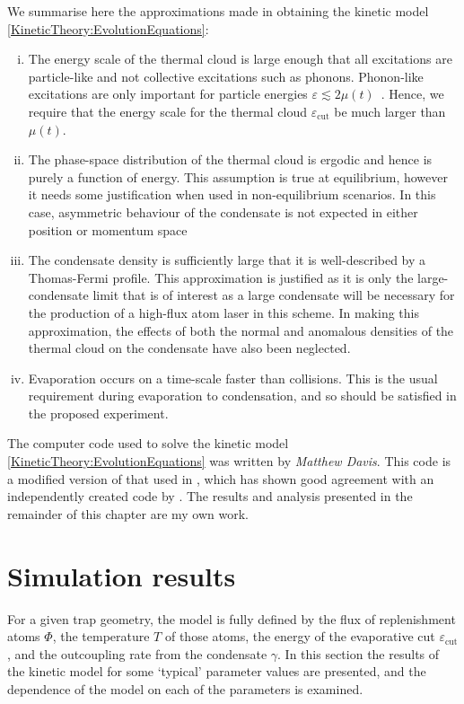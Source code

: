 We summarise here the approximations made in obtaining the kinetic model \eqref{KineticTheory:EvolutionEquations}:
\begin{enumerate}[(i)]
    \item The energy scale of the thermal cloud is large enough that all excitations are particle-like and not collective excitations such as phonons. Phonon-like excitations are only important for particle energies $\varepsilon \lesssim 2\mu(t)$~\citep[\S 8.3.1]{PethickSmith}. Hence, we require that the energy scale for the thermal cloud $\varepsilon_\text{cut}$ be much larger than $\mu(t)$.
    \item The phase-space distribution of the thermal cloud is ergodic and hence is purely a function of energy. This assumption is true at equilibrium, however it needs some justification when used in non-equilibrium scenarios. In this case, asymmetric behaviour of the condensate is not expected in either position or momentum space 
    \item The condensate density is sufficiently large that it is well-described by a Thomas-Fermi profile. This approximation is justified as it is only the large-condensate limit that is of interest as a large condensate will be necessary for the production of a high-flux atom laser in this scheme. In making this approximation, the effects of both the normal and anomalous densities of the thermal cloud on the condensate have also been neglected.
    \item Evaporation occurs on a time-scale faster than collisions. This is the usual requirement during evaporation to condensation, and so should be satisfied in the proposed experiment.
\end{enumerate}

The computer code used to solve the kinetic model \eqref{KineticTheory:EvolutionEquations} was written by \emph{Matthew Davis}.  This code is a modified version of that used in \citep{Davis:2000vn}, which has shown good agreement with an independently created code by \citet{Bijlsma:2000}.  The results and analysis presented in the remainder of this chapter are my own work.

\section{Simulation results}
\label{KineticTheory:Results}

For a given trap geometry, the model is fully defined by the flux of replenishment atoms $\Phi$, the temperature $T$ of those atoms, the energy of the evaporative cut $\varepsilon_\text{cut}$, and the outcoupling rate from the condensate $\gamma$. In this section the results of the kinetic model for some `typical' parameter values are presented, and the dependence of the model on each of the parameters is examined.

